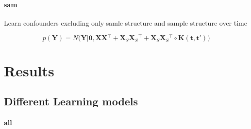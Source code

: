 \documentclass[a4paper,tablecaptionabove]{article}
\newcommand{\matr}[1]{\ensuremath{\mathbf{#1}}}
\newcommand{\T}{\ensuremath{^\top}}
\begin{document}
\paragraph{sam}
\label{sec:sam}
Learn confounders excluding only samle structure and sample structure
over time

\begin{equation}
  \label{eq:9}
  p(\matr Y) = N\big(\matr Y|\matr 0, \matr{XX}\T + \matr X_S\matr X_S\T +
  \matr X_S\matr X_S\T \circ \matr
  K(\matr t,\matr t')\big)
\end{equation}

\section{Results}
\label{sec:results}

\subsection{Different Learning models}
\label{sec:diff-learn-models-1}

\paragraph{all}
\label{sec:all-1}






\end{document}
